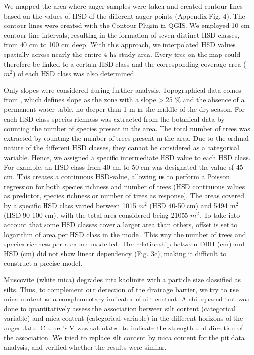 \documentclass[fleqn,11pt]{latex/stylish_article} %
\begin{document}
We mapped the area where auger samples were taken and created contour lines based on the values of HSD of the different auger points (Appendix Fig. 4). The contour lines were created with the Contour Plugin in QGIS. We employed 10 cm contour line intervals, resulting in the formation of seven distinct HSD classes, from 40 cm to 100 cm deep. With this approach, we interpolated HSD values spatially across nearly the entire 4 ha study area. Every tree on the map could therefore be linked to a certain HSD class and the corresponding coverage area (\(m^2\)) of each HSD class was also determined.

Only slopes were considered during further analysis. Topographical data comes from \citep{dourdainGISDATADICTIONARY2022}, which defines slope as the zone with a slope \textgreater{} 25 \% and the absence of a permanent water table, no deeper than 1 m in the middle of the dry season. For each HSD class species richness was extracted from the botanical data by counting the number of species present in the area. The total number of trees was extracted by counting the number of trees present in the area. Due to the ordinal nature of the different HSD classes, they cannot be considered as a categorical variable. Hence, we assigned a specific intermediate HSD value to each HSD class. For example, an HSD class from 40 cm to 50 cm was designated the value of 45 cm. This creates a continuous HSD-value, allowing us to perform a Poisson regression for both species richness and number of trees (HSD continuous values as predictor, species richness or number of trees as response). The areas covered by a specific HSD class varied between 1015 \(m^2\) (HSD 40-50 cm) and 5494 \(m^2\) (HSD 90-100 cm), with the total area considered being 21055 \(m^2\). To take into account that some HSD classes cover a larger area than others, offset is set to logarithm of area per HSD class in the model. This way the number of trees and species richness per area are modelled. The relationship between DBH (cm) and HSD (cm) did not show linear dependency (Fig. 3c), making it difficult to construct a precise model.

Muscovite (white mica) degrades into kaolinite \citep{nicoliniEvidenceWeatheringStages2009} with a particle size classified as silts. Thus, to complement our detection of the drainage barrier, we try to use mica content as a complementary indicator of silt content. A chi-squared test was done to quantitatively assess the association between silt content (categorical variable) and mica content (categorical variable) in the different horizons of the auger data. Cramer's V was calculated to indicate the strength and direction of the association. We tried to replace silt content by mica content for the pit data analysis, and verified whether the results were similar.
\end{document}
